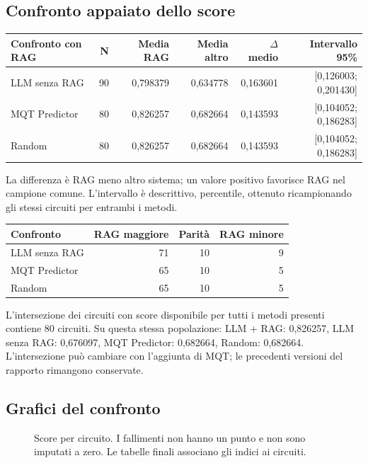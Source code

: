 \subsection{Confronto appaiato dello score}
\begingroup\footnotesize
\setlength{\tabcolsep}{5pt}
\begin{center}
\begin{tabular}{lrrrrr}
\toprule
Confronto con RAG & N & Media RAG & Media altro & $\Delta$ medio & Intervallo 95\% \\
\midrule
LLM senza RAG & 90 & 0,798379 & 0,634778 & 0,163601 & [0,126003; 0,201430] \\
MQT Predictor & 80 & 0,826257 & 0,682664 & 0,143593 & [0,104052; 0,186283] \\
Random & 80 & 0,826257 & 0,682664 & 0,143593 & [0,104052; 0,186283] \\
\bottomrule
\end{tabular}
\end{center}
\endgroup
La differenza è RAG meno altro sistema; un valore positivo favorisce RAG nel campione comune. L’intervallo è descrittivo, percentile, ottenuto ricampionando gli stessi circuiti per entrambi i metodi.

\begingroup\small
\setlength{\tabcolsep}{5pt}
\begin{center}
\begin{tabular}{lrrr}
\toprule
Confronto & RAG maggiore & Parità & RAG minore \\
\midrule
LLM senza RAG & 71 & 10 & 9 \\
MQT Predictor & 65 & 10 & 5 \\
Random & 65 & 10 & 5 \\
\bottomrule
\end{tabular}
\end{center}
\endgroup
L'intersezione dei circuiti con score disponibile per tutti i metodi presenti contiene 80 circuiti. Su questa stessa popolazione: LLM + RAG: 0,826257, LLM senza RAG: 0,676097, MQT Predictor: 0,682664, Random: 0,682664. L’intersezione può cambiare con l’aggiunta di MQT; le precedenti versioni del rapporto rimangono conservate.
\subsection{Grafici del confronto}

\begin{figure}[!htbp]\centering

\caption{Score per circuito. I fallimenti non hanno un punto e non sono imputati a zero. Le tabelle finali associano gli indici ai circuiti.}
\end{figure}

